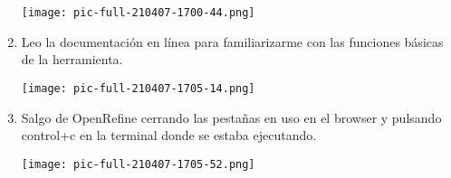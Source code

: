\documentclass{article}
\begin{document}
\begin{enumerate}
\begin{center}
			\texttt{[image: pic-full-210407-1700-44.png]}
		\end{center}
\newpage
	\item{Leo la documentación en línea para familiarizarme con las funciones básicas de la herramienta.}
		\begin{center}
			\texttt{[image: pic-full-210407-1705-14.png]}
		\end{center}
	\item{Salgo de OpenRefine cerrando las pestañas en uso en el browser y pulsando control+c en la terminal donde se estaba ejecutando.}
		\begin{center}
			\texttt{[image: pic-full-210407-1705-52.png]}
		\end{center}
\end{enumerate}
\end{document}
